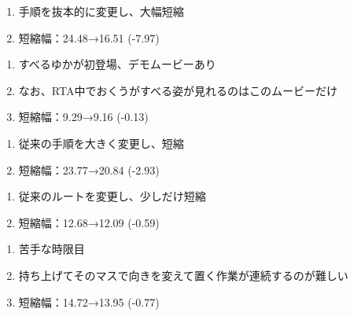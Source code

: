 \begin{enumerate}[label={\sarrow}]
\item 手順を抜本的に変更し、大幅短縮
\item 短縮幅：24.48→16.51 (-7.97)
\end{enumerate}



\begin{enumerate}[label={\sarrow}]
\item すべるゆかが初登場、デモムービーあり
\item なお、RTA中でおくうがすべる姿が見れるのはこのムービーだけ
\item 短縮幅：9.29→9.16 (-0.13)
\end{enumerate}



\clearpage
\begin{enumerate}[label={\sarrow}]
\item 従来の手順を大きく変更し、短縮
\item 短縮幅：23.77→20.84 (-2.93)
\end{enumerate}



\begin{enumerate}[label={\sarrow}]
\item 従来のルートを変更し、少しだけ短縮
\item 短縮幅：12.68→12.09 (-0.59)
\end{enumerate}



\begin{enumerate}[label={\sarrow}]
\item 苦手な時限目
\item 持ち上げてそのマスで向きを変えて置く作業が連続するのが難しい
\item 短縮幅：14.72→13.95 (-0.77)
\end{enumerate}




